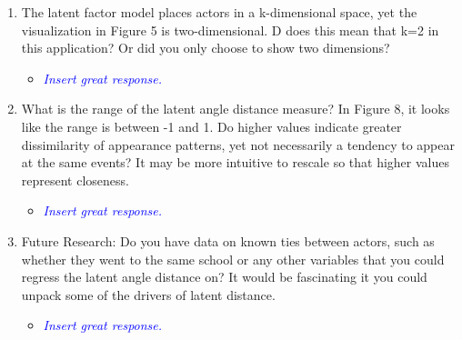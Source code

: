 \begin{enumerate}
	\item The latent factor model places actors in a k-dimensional space, yet the visualization in Figure 5 is two-dimensional. D does this mean that k=2 in this application? Or did you only choose to show two dimensions?
	\begin{itemize}
		\item \textcolor{blue}{ \emph{
			Insert great response.
		}}
	\end{itemize}
	\item What is the range of the latent angle distance measure? In Figure 8, it looks like the range is between -1 and 1. Do higher values indicate greater dissimilarity of appearance patterns, yet not necessarily a tendency to appear at the same events?  It may be more intuitive to rescale so that higher values represent closeness.
	\begin{itemize}
		\item \textcolor{blue}{ \emph{
			Insert great response.
		}}
	\end{itemize}
	\item Future Research: Do you have data on known ties between actors, such as whether they went to the same school or any other variables that you could regress the latent angle distance on?  It would be fascinating it you could unpack some of the drivers of latent distance.
	\begin{itemize}
		\item \textcolor{blue}{ \emph{
			Insert great response.
		}}
	\end{itemize}
\end{enumerate}
